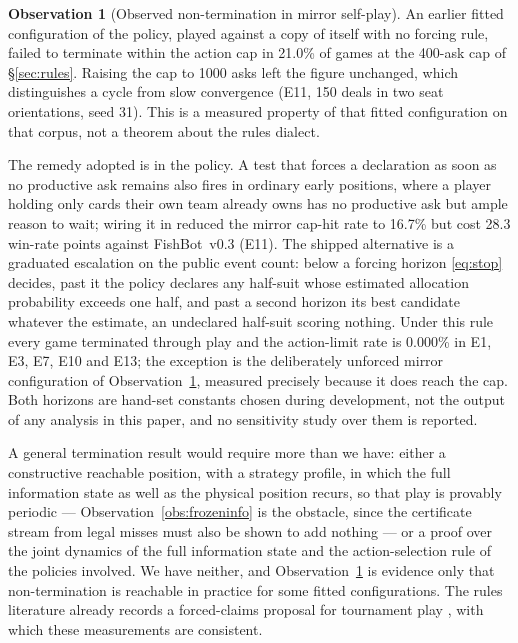 \documentclass[11pt]{article}
\theoremstyle{definition}
\newtheorem{observation}[theorem]{Observation}
\DeclareRobustCommand{\vthree}{\texorpdfstring{\mbox{FishBot v0.3}}{FishBot v0.3}}
\newcommand{\numLimitRate}{0.000\%}
\newcommand{\numMirrorCycle}{21.0}
\newcommand{\numDeadAskCost}{28.3}
\newcommand{\numDeadAskCycle}{16.7}
\begin{document}
\begin{observation}[Observed non-termination in mirror self-play]
\label{obs:cycle}
An earlier fitted configuration of the policy, played against a copy of itself
with no forcing rule, failed to terminate within the action cap in
\numMirrorCycle\% of games at the 400-ask cap of \S\ref{sec:rules}. Raising the
cap to 1000 asks left the figure unchanged, which distinguishes a cycle from slow
convergence (E11, 150 deals in two seat orientations, seed 31). This is a
measured property of that fitted configuration on that corpus, not a theorem
about the rules dialect.
\end{observation}

The remedy adopted is in the policy. A test that forces a declaration as soon as
no productive ask remains also fires in ordinary early positions, where a player
holding only cards their own team already owns has no productive ask but ample
reason to wait; wiring it in reduced the mirror cap-hit rate to
\numDeadAskCycle\% but cost \numDeadAskCost{} win-rate points against \vthree{}
(E11). The shipped alternative is a graduated escalation on the public event
count: below a forcing horizon \eqref{eq:stop} decides, past it the policy
declares any half-suit whose estimated allocation probability exceeds one half,
and past a second horizon its best candidate whatever the estimate, an
undeclared half-suit scoring nothing. Under this rule every game terminated
through play and the action-limit rate is \numLimitRate{} in E1, E3, E7, E10 and
E13; the exception is the deliberately unforced mirror configuration of
Observation~\ref{obs:cycle}, measured precisely because it does reach the cap.
Both horizons are hand-set constants chosen during development, not the
output of any analysis in this paper, and no sensitivity study over them is
reported.

A general termination result would require more than we have: either a
constructive reachable position, with a strategy profile, in which the full
information state as well as the physical position recurs, so that play is
provably periodic --- Observation~\ref{obs:frozeninfo} is the obstacle, since the
certificate stream from legal misses must also be shown to add nothing --- or a
proof over the joint dynamics of the full information state and the
action-selection rule of the policies involved. We have neither, and
Observation~\ref{obs:cycle} is evidence only that non-termination is reachable in
practice for some fitted configurations. The rules literature
already records a forced-claims proposal for tournament play \cite{pagat}, with
which these measurements are consistent.
\end{document}
